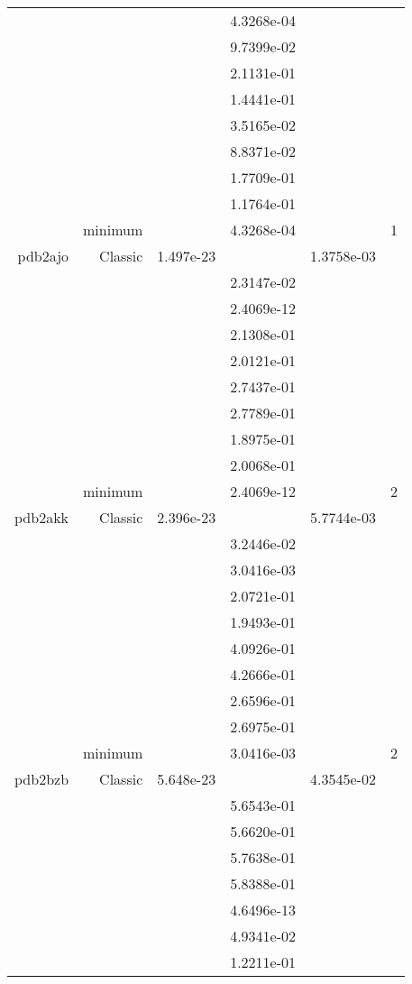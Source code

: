 \begin{xltabular}{\textwidth}{r|rS[table-format=1.3e+2]S[table-format=1.4e+2]S[table-format=1.4e+2]S[table-format=-1.5]}
&  &  & 4.3268e-04 & & \\
&  &  & 9.7399e-02 & & \\
&  &  & 2.1131e-01 & & \\
&  &  & 1.4441e-01 & & \\
&  &  & 3.5165e-02 & & \\
&  &  & 8.8371e-02 & & \\
&  &  & 1.7709e-01 & & \\
&  &  & 1.1764e-01 & & \\
& minimum &  & 4.3268e-04 & & 1 \\  \addlinespace
pdb2ajo & Classic & 1.497e-23 &  & 1.3758e-03 & \\
&  &  & 2.3147e-02 & & \\
&  &  & 2.4069e-12 & & \\
&  &  & 2.1308e-01 & & \\
&  &  & 2.0121e-01 & & \\
&  &  & 2.7437e-01 & & \\
&  &  & 2.7789e-01 & & \\
&  &  & 1.8975e-01 & & \\
&  &  & 2.0068e-01 & & \\
& minimum &  & 2.4069e-12 & & 2 \\  \addlinespace
pdb2akk & Classic & 2.396e-23 &  & 5.7744e-03 & \\
&  &  & 3.2446e-02 & & \\
&  &  & 3.0416e-03 & & \\
&  &  & 2.0721e-01 & & \\
&  &  & 1.9493e-01 & & \\
&  &  & 4.0926e-01 & & \\
&  &  & 4.2666e-01 & & \\
&  &  & 2.6596e-01 & & \\
&  &  & 2.6975e-01 & & \\
& minimum &  & 3.0416e-03 & & 2 \\  \addlinespace
pdb2bzb & Classic & 5.648e-23 &  & 4.3545e-02 & \\
&  &  & 5.6543e-01 & & \\
&  &  & 5.6620e-01 & & \\
&  &  & 5.7638e-01 & & \\
&  &  & 5.8388e-01 & & \\
&  &  & 4.6496e-13 & & \\
&  &  & 4.9341e-02 & & \\
&  &  & 1.2211e-01 & & \\

\end{xltabular}
